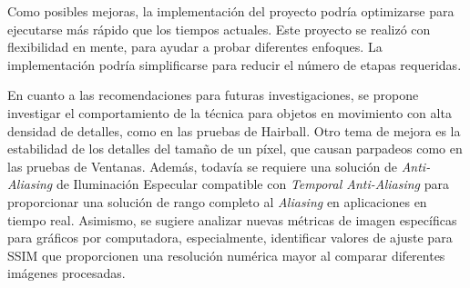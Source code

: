 \documentclass[pregrado]{tesis-usb} %
\begin{document}
Como posibles mejoras, la implementación del proyecto podría optimizarse para ejecutarse más rápido que los tiempos actuales. Este proyecto se realizó con flexibilidad en mente, para ayudar a probar diferentes enfoques. La implementación podría simplificarse para reducir el número de etapas requeridas.

En cuanto a las recomendaciones para futuras investigaciones, se propone investigar el comportamiento de la técnica para objetos en movimiento con alta densidad de detalles, como en las pruebas de Hairball. Otro tema de mejora es la estabilidad de los detalles del tamaño de un píxel, que causan parpadeos como en las pruebas de Ventanas. Además, todavía se requiere una solución de \textit{Anti-Aliasing} de Iluminación Especular compatible con \textit{Temporal Anti-Aliasing} para proporcionar una solución de rango completo al \textit{Aliasing} en aplicaciones en tiempo real. Asimismo, se sugiere analizar nuevas métricas de imagen específicas para gráficos por computadora, especialmente, identificar valores de ajuste para SSIM que proporcionen una resolución numérica mayor al comparar diferentes imágenes procesadas.




\appendix
\end{document}
